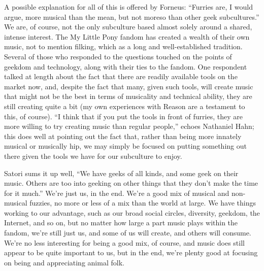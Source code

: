 A possible explanation for all of this is offered by Forneus: ``Furries
are, I would argue, more musical than the mean, but not moreso than
other geek subcultures.'' We are, of course, not the only subculture
based almost solely around a shared, intense interest. The My Little
Pony fandom has created a wealth of their own music, not to mention
filking, which as a long and well-established tradition. Several of
those who responded to the questions touched on the points of geekdom
and technology, along with their ties to the fandom. One respondent
talked at length about the fact that there are readily available tools
on the market now, and, despite the fact that many, given such tools,
will create music that might not be the best in terms of musicality and
technical ability, they are still creating quite a bit (my own
experiences with Reason are a testament to this, of course). ``I think
that if you put the tools in front of furries, they are more willing to
try creating music than regular people,'' echoes Nathaniel Hahn; this
does well at pointing out the fact that, rather than being more innately
musical or musically hip, we may simply be focused on putting something
out there given the tools we have for our subculture to enjoy.

Satori sums it up well, ``We have geeks of all kinds, and some geek on
their music. Others are too into geeking on other things that they don't
make the time for it much.'' We're just us, in the end. We're a good mix
of musical and non-musical fuzzies, no more or less of a mix than the
world at large. We have things working to our advantage, such as our
broad social circles, diversity, geekdom, the Internet, and so on, but
no matter how large a part music plays within the fandom, we're still
just us, and some of us will create, and others will consume. We're no
less interesting for being a good mix, of course, and music does still
appear to be quite important to us, but in the end, we're plenty good at
focusing on being and appreciating animal folk.
